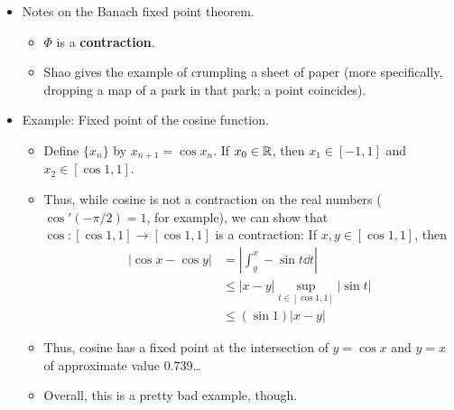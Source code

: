 \documentclass[../notes.tex]{subfiles}
\begin{document}
\begin{itemize}
\begin{proof}
\begin{align*}
            &\leq d(x,x_n)+d(x_n,x_{n+1})+q\cdot d(x_n,x)\\
            &= (1+q)\cdot d(x,x_n)+d(x_n,x_{n+1})
        \end{align*}
        where the first term converges since $\{x_n\}$ is convergent and the second term converges since $\{x_n\}$ is Cauchy. Thus, $d(x,\Phi(x))\to 0$ as $n\to\infty$, so $x=\Phi(x)$, as desired.\par
        Lastly, we prove that $x$ is unique. Suppose that there exists $y\in X$ such that $y=\Phi(y)$. Then
        \begin{equation*}
            d(x,y) = d(\Phi(x),\Phi(y))
            \leq q\cdot d(x,y)
        \end{equation*}
        It follows that $d(x,y)\leq q^n\cdot d(x,y)$, i.e., that $d(x,y)\to 0$ as $n\to\infty$. Therefore, we must have that $d(x,y)=0$, from which it follows that $x=y$, as desired.
    \end{proof}
    \item Notes on the Banach fixed point theorem.
    \begin{itemize}
        \item $\Phi$ is a \textbf{contraction}.
        \item Shao gives the example of crumpling a sheet of paper (more specifically, dropping a map of a park in that park; a point coincides).
    \end{itemize}
    \item Example: Fixed point of the cosine function.
    \begin{itemize}
        \item Define $\{x_n\}$ by $x_{n+1}=\cos x_n$. If $x_0\in\mathbb{R}$, then $x_1\in[-1,1]$ and $x_2\in[\cos 1,1]$.
        \item Thus, while cosine is not a contraction on the real numbers ($\cos'(-\pi/2)=1$, for example), we can show that $\cos:[\cos 1,1]\to[\cos 1,1]$ is a contraction: If $x,y\in[\cos 1,1]$, then
        \begin{align*}
            |\cos x-\cos y| &= \left| \int_y^x-\sin t\dd{t} \right|\\
            &\leq |x-y|\sup_{t\in[\cos 1,1]}|\sin t|\\
            &\leq (\sin 1)|x-y|
        \end{align*}
        \item Thus, cosine has a fixed point at the intersection of $y=\cos x$ and $y=x$ of approximate value 0.739\dots
        \item Overall, this is a pretty bad example, though.

\end{itemize}
\end{itemize}
\end{document}
